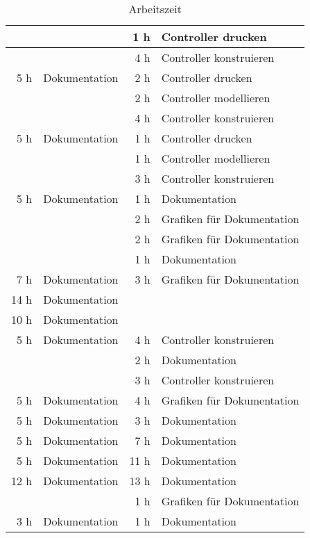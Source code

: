 \begin{table}[htbp]
\begin{tabular}{|r|l|r|l|}
    \hline
          &       & 1 h   & Controller drucken \\
    \hline
          &       & 4 h   & Controller konstruieren \\
    \hline
    5 h   & Dokumentation & 2 h   & Controller drucken \\
    \hline
          &       & 2 h   & Controller modellieren \\
    \hline
          &       & 4 h   & Controller konstruieren \\
    \hline
    5 h   & Dokumentation & 1 h   & Controller drucken \\
    \hline
          &       & 1 h   & Controller modellieren \\
    \hline
          &       & 3 h   & Controller konstruieren \\
    \hline
    5 h   & Dokumentation & 1 h   & Dokumentation \\
    \hline
          &       & 2 h   & Grafiken für Dokumentation \\
    \hline
          &       & 2 h   & Grafiken für Dokumentation \\
    \hline
          &       & 1 h   & Dokumentation \\
    \hline
    7 h   & Dokumentation & 3 h   & Grafiken für Dokumentation \\
    \hline
    14 h  & Dokumentation &       &  \\
    \hline
    10 h  & Dokumentation &       &  \\
    \hline
    5 h   & Dokumentation & 4 h   & Controller konstruieren \\
    \hline
          &       & 2 h   & Dokumentation \\
    \hline
          &       & 3 h   & Controller konstruieren \\
    \hline
    5 h   & Dokumentation & 4 h   & Grafiken für Dokumentation \\
    \hline
    5 h   & Dokumentation & 3 h   & Dokumentation \\
    \hline
    5 h   & Dokumentation & 7 h   & Dokumentation \\
    \hline
    5 h   & Dokumentation & 11 h  & Dokumentation \\
    \hline
    12 h  & Dokumentation & 13 h  & Dokumentation \\
    \hline
          &       & 1 h   & Grafiken für Dokumentation \\
    \hline
    3 h   & Dokumentation & 1 h   & Dokumentation \\
    \hline
    \end{tabular}%
    \caption{Arbeitszeit}
  \label{tab:arbeitszeit}%
\end{table}%

